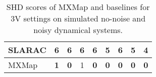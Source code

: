 \begin{table}[htb]
{{\begin{tabular}{l|cc|cc|cc|cc}
SLARAC                                          & 6                            & 6                          & 6                            & 6                          & 5                            & 6                          & 5                            & 4                         \\ \hline
MXMap                                           & \textbf{1}                   & \textbf{0}                 & 1                            & \textbf{0}                 & \textbf{0}                   & \textbf{0}                 & \textbf{0}                   & \textbf{0}               
\end{tabular}
} }
\caption{SHD scores of MXMap and baselines for 3V settings on simulated no-noise and noisy dynamical systems.}
\label{tab:mxmap-sim-3V}
\end{table}

